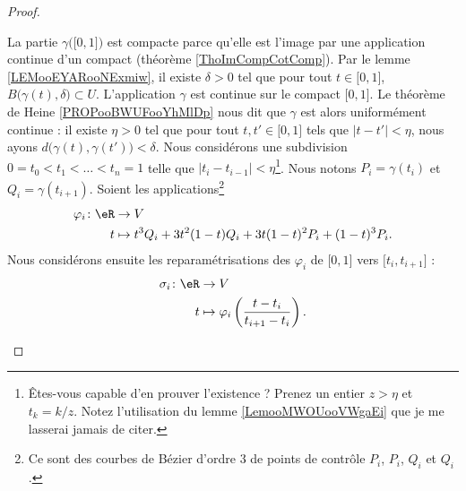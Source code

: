 \begin{proof}
	\begin{subproof}
		La partie \( \gamma\big( \mathopen[ 0 , 1 \mathclose] \big)\) est compacte parce qu'elle est l'image par une application continue d'un compact (théorème \ref{ThoImCompCotComp}). Par le lemme \ref{LEMooEYARooNExmiw}, il existe \( \delta>0\) tel que pour tout \( t\in \mathopen[ 0 , 1 \mathclose]\), \( B\big( \gamma(t),\delta \big)\subset U\).
		L'application \( \gamma\) est continue sur le compact \( \mathopen[ 0 , 1 \mathclose]\). Le théorème de Heine \ref{PROPooBWUFooYhMlDp} nous dit que \( \gamma\) est alors uniformément continue : il existe \( \eta>0\) tel que pour tout \( t,t'\in\mathopen[ 0 , 1 \mathclose]\) tels que \( | t-t' |<\eta\), nous ayons \( d\big( \gamma(t),\gamma(t') \big)<\delta\).
		\spitem[La courbe]
		Nous considérons une subdivision \( 0=t_0<t_1<\ldots <t_n=1\) telle que \( | t_i-t_{i-1} |<\eta\)\footnote{Êtes-vous capable d'en prouver l'existence ? Prenez un entier \( z>\eta\) et \( t_k=k/z\). Notez l'utilisation du lemme \ref{LemooMWOUooVWgaEi} que je me lasserai jamais de citer.}. Nous notons \( P_i=\gamma(t_i)\) et \( Q_i=\gamma(t_{i+1})\). Soient les applications\footnote{Ce sont des courbes de Bézier d'ordre \( 3\) de points de contrôle \( P_i\), \( P_i\), \( Q_i\) et \( Q_i\).}
		\begin{equation}
			\begin{aligned}
				\varphi_i\colon \eR & \to V                                                \\
				t                   & \mapsto t^3Q_i+3t^2(1-t)Q_i+3t(1-t)^2P_i+(1-t)^3P_i.
			\end{aligned}
		\end{equation}
		Nous considérons ensuite les reparamétrisations des \( \varphi_i\) de \( \mathopen[ 0 , 1 \mathclose]\) vers \( \mathopen[ t_i , t_{i+1} \mathclose]\) :
		\begin{equation}
			\begin{aligned}
				\sigma_i\colon \eR & \to V                                                          \\
				t                  & \mapsto \varphi_i\left( \frac{ t-t_i }{ t_{i+1}-t_i } \right).
			\end{aligned}

\end{equation}
\end{subproof}
\end{proof}
